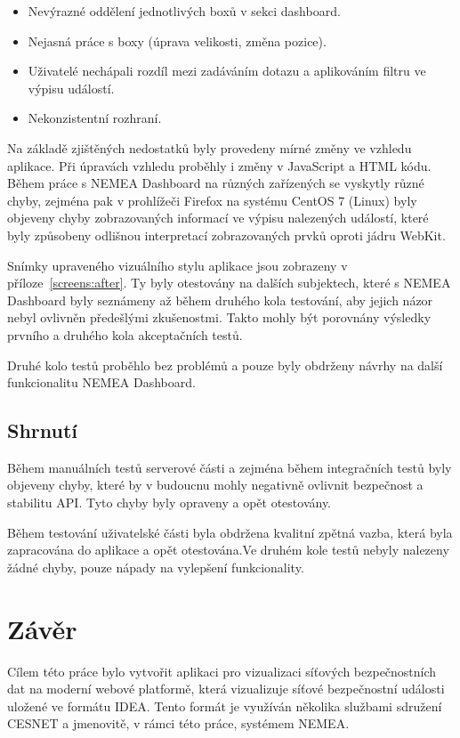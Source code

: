 \begin{itemize}
    \item Nevýrazné oddělení jednotlivých boxů v sekci dashboard.
    \item Nejasná práce s boxy (úprava velikosti, změna pozice).
    \item Uživatelé nechápali rozdíl mezi zadáváním dotazu a aplikováním filtru ve výpisu událostí.
    \item Nekonzistentní rozhraní.
\end{itemize}

Na základě zjištěných nedostatků byly provedeny mírné změny ve vzhledu aplikace. Při úpravách vzhledu proběhly i změny v JavaScript a HTML kódu. Během práce s NEMEA Dashboard na různých zařízených se vyskytly různé chyby, zejména pak v prohlížeči Firefox na systému CentOS 7 (Linux) byly objeveny chyby zobrazovaných informací ve výpisu nalezených událostí, které byly způsobeny odlišnou interpretací zobrazovaných prvků oproti jádru WebKit. 

Snímky upraveného vizuálního stylu aplikace jsou zobrazeny v příloze~\ref{screens:after}. Ty byly otestovány na dalších subjektech, které s NEMEA Dashboard byly seznámeny až během druhého kola testování, aby jejich názor nebyl ovlivněn předešlými zkušenostmi. Takto mohly být porovnány výsledky prvního a druhého kola akceptačních testů.

Druhé kolo testů proběhlo bez problémů a pouze byly obdrženy návrhy na další funkcionalitu NEMEA Dashboard.

\section{Shrnutí}

Během manuálních testů serverové části a zejména během integračních testů byly objeveny chyby, které by v budoucnu mohly negativně ovlivnit bezpečnost a stabilitu API. Tyto chyby byly opraveny a opět otestovány. 

Během testování uživatelské části byla obdržena kvalitní zpětná vazba, která byla zapracována do aplikace a opět otestována.Ve druhém kole testů nebyly nalezeny žádné chyby, pouze nápady na vylepšení funkcionality.  

\chapter{Závěr}

Cílem této práce bylo vytvořit aplikaci pro vizualizaci síťových bezpečnostních dat na moderní webové platformě, která vizualizuje síťové bezpečnostní události uložené ve formátu IDEA. Tento formát je využíván několika službami sdružení CESNET a jmenovitě, v rámci této práce, systémem NEMEA. 

